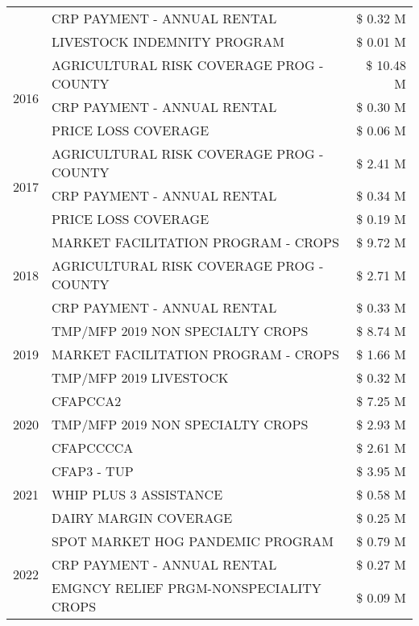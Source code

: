 \begin{tabular}{llr}
 & CRP PAYMENT - ANNUAL RENTAL & \$ 0.32 M \\
 & LIVESTOCK INDEMNITY PROGRAM & \$ 0.01 M \\
\cline{1-3}
\multirow[t]{3}{*}{2016} & AGRICULTURAL RISK COVERAGE PROG - COUNTY & \$ 10.48 M \\
 & CRP PAYMENT - ANNUAL RENTAL & \$ 0.30 M \\
 & PRICE LOSS COVERAGE & \$ 0.06 M \\
\cline{1-3}
\multirow[t]{3}{*}{2017} & AGRICULTURAL RISK COVERAGE PROG - COUNTY & \$ 2.41 M \\
 & CRP PAYMENT - ANNUAL RENTAL & \$ 0.34 M \\
 & PRICE LOSS COVERAGE & \$ 0.19 M \\
\cline{1-3}
\multirow[t]{3}{*}{2018} & MARKET FACILITATION PROGRAM - CROPS & \$ 9.72 M \\
 & AGRICULTURAL RISK COVERAGE PROG - COUNTY & \$ 2.71 M \\
 & CRP PAYMENT - ANNUAL RENTAL & \$ 0.33 M \\
\cline{1-3}
\multirow[t]{3}{*}{2019} & TMP/MFP 2019 NON SPECIALTY CROPS & \$ 8.74 M \\
 & MARKET FACILITATION PROGRAM - CROPS & \$ 1.66 M \\
 & TMP/MFP 2019 LIVESTOCK & \$ 0.32 M \\
\cline{1-3}
\multirow[t]{3}{*}{2020} & CFAPCCA2 & \$ 7.25 M \\
 & TMP/MFP 2019 NON SPECIALTY CROPS & \$ 2.93 M \\
 & CFAPCCCCA & \$ 2.61 M \\
\cline{1-3}
\multirow[t]{3}{*}{2021} & CFAP3 - TUP & \$ 3.95 M \\
 & WHIP PLUS 3 ASSISTANCE & \$ 0.58 M \\
 & DAIRY MARGIN COVERAGE & \$ 0.25 M \\
\cline{1-3}
\multirow[t]{3}{*}{2022} & SPOT MARKET HOG PANDEMIC PROGRAM & \$ 0.79 M \\
 & CRP PAYMENT - ANNUAL RENTAL & \$ 0.27 M \\
 & EMGNCY RELIEF PRGM-NONSPECIALITY CROPS & \$ 0.09 M \\
\cline{1-3}
\bottomrule
\end{tabular}
